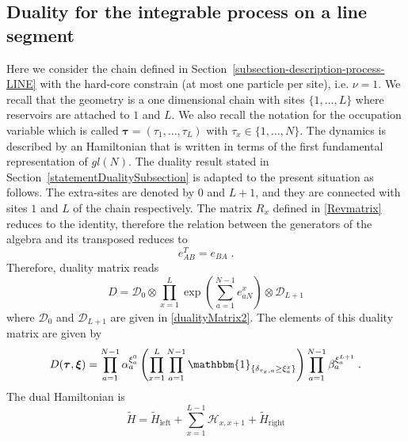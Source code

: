 \documentclass[10pt]{article}
\numberwithin{equation}{section}
\numberwithin{equation}{subsection}
\newcommand{\dt}{\;.}
\begin{document}
\subsection{Duality for the integrable process on a line segment}\label{integrableChain-duality}
Here we consider the chain defined in Section~\ref{subsection-description-process-LINE} with the hard-core constrain {\color{blue} (at most one particle per site)}, i.e. $\nu=1$. 
We recall that the geometry is a one dimensional chain with sites $\{1,\ldots,L\}$ where reservoirs are attached to $1$ and $L$. 
We also recall the notation for the occupation variable which is called $\bm{\tau}=(\tau_1,\ldots,\tau_L)$ with $\tau_x\in\{1,\ldots,N\}$.
The dynamics is described by an Hamiltonian that is written in terms of the first fundamental representation of ${gl}(N)$. The duality result stated in Section~\ref{statementDualitySubsection} is adapted to the present situation as follows. 
The extra-sites are denoted by $0$ and $L+1$, and they are connected with sites $1$ and $L$ of the chain respectively. The matrix $R_{x}$ defined in \eqref{Revmatrix} 
reduces to the identity, therefore the relation between the generators of the algebra and its transposed reduces to
\begin{equation}\label{transpostionPropertyFund}
	e_{AB}^T= e_{BA}\dt
\end{equation}
Therefore, duality matrix reads
\begin{equation}
	D=\mathcal{D}_{0}\otimes\prod_{x=1}^{L}\exp{\left(\sum_{a=1}^{N-1}e_{aN}^{x}\right)}\otimes \mathcal{D}_{L+1}
\end{equation}
where $\mathcal{D}_{0}$ and $\mathcal{D}_{L+1}$ are given in \eqref{dualityMatrix2}. 
The elements of this duality matrix are given by
\begin{equation}\label{ElementsDualityMatrixChain_1}
	D(\bm{\tau},\bm{\xi})=\prod_{a=1}^{N-1}\alpha_{a}^{\xi_{a}^{0}}\left(\prod_{x=1}^{L}\prod_{a=1}^{N-1}\mathbbm{1}_{\{\delta_{\tau_{x},a}\geq \xi_{a}^{x}\}}\right)\prod_{a=1}^{N-1}\beta_{a}^{\xi_{a}^{L+1}}\dt
\end{equation}
The dual Hamiltonian is
\begin{equation}
	\widetilde{H}=\widetilde{H}_{\text{left}}+\sum_{x=1}^{L-1}\mathcal{H}_{x,x+1}+\widetilde{H}_{\text{right}}
\end{equation}
\end{document}
